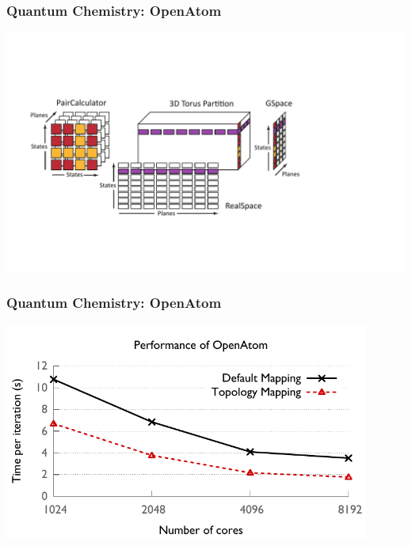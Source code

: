 \begin{frame}
\frametitle{Quantum Chemistry: OpenAtom}
\includegraphics[width=0.45\textheight]{../figures/openatom/mapping.pdf}
\end{frame}


\begin{frame}
\frametitle{Quantum Chemistry: OpenAtom}
\includegraphics[width=0.9\textwidth]{../figures/openatom/map.pdf}
\end{frame}



